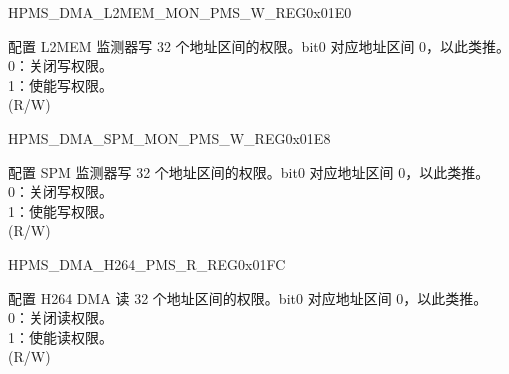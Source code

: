 \begin{register}{H}{PMS\_DMA\_L2MEM\_MON\_PMS\_W\_REG}{0x01E0}\label{regdesc:PMSDMAL2MEMMONPMSWREG}
%
\regnewline%
\begin{regdesc}\begin{reglist}
\label{fielddesc:PMSDMAL2MEMMONWPMS}\item [PMS\_DMA\_L2MEM\_MON\_W\_PMS] 配置 L2MEM 监测器写 32 个地址区间的权限。bit0 对应地址区间 0，以此类推。\\
0：关闭写权限。\\
1：使能写权限。\\ (R/W)
\end{reglist}\end{regdesc}
\end{register}


\begin{register}{H}{PMS\_DMA\_SPM\_MON\_PMS\_W\_REG}{0x01E8}\label{regdesc:PMSDMASPMMONPMSWREG}
%
\regnewline%
\begin{regdesc}\begin{reglist}
\label{fielddesc:PMSDMASPMMONWPMS}\item [PMS\_DMA\_SPM\_MON\_W\_PMS] 配置 SPM 监测器写 32 个地址区间的权限。bit0 对应地址区间 0，以此类推。\\
0：关闭写权限。\\
1：使能写权限。\\ (R/W)
\end{reglist}\end{regdesc}
\end{register}


\begin{register}{H}{PMS\_DMA\_H264\_PMS\_R\_REG}{0x01FC}\label{regdesc:PMSDMAH264PMSRREG}
%
\regnewline%
\begin{regdesc}\begin{reglist}
\label{fielddesc:PMSDMAH264RPMS}\item [PMS\_DMA\_H264\_R\_PMS] 配置 H264 DMA 读 32 个地址区间的权限。bit0 对应地址区间 0，以此类推。\\
0：关闭读权限。\\
1：使能读权限。\\ (R/W)
\end{reglist}\end{regdesc}
\end{register}


